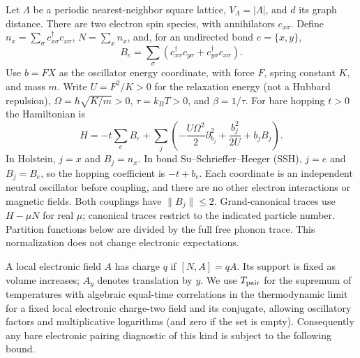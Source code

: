 \documentclass[11pt]{article}
\begin{document}
Let $\Lambda$ be a periodic nearest-neighbor square lattice, $V_\Lambda=|\Lambda|$, and $d$ its graph distance. There are two electron spin species, with annihilators $c_{x\sigma}$. Define $n_x=\sum_\sigma c_{x\sigma}^\dagger c_{x\sigma}$, $N=\sum_x n_x$, and, for an undirected bond $e=\{x,y\}$,
\[
 B_e=\sum_\sigma (c_{x\sigma}^\dagger c_{y\sigma}+c_{y\sigma}^\dagger c_{x\sigma}).
\]
Use $b=FX$ as the oscillator energy coordinate, with force $F$, spring constant $K$, and mass $m$. Write $U=F^2/K>0$ for the relaxation energy (not a Hubbard repulsion), $\Omega=\hbar\sqrt{K/m}>0$, $\tau=k_BT>0$, and $\beta=1/\tau$. For bare hopping $t>0$ the Hamiltonian is
\begin{equation}\label{eq:model}
 H=-t\sum_e B_e+\sum_j\left(-\frac{U\Omega^2}{2}\partial_{b_j}^2+\frac{b_j^2}{2U}+b_j B_j\right).
\end{equation}
In Holstein, $j=x$ and $B_j=n_x$. In bond Su--Schrieffer--Heeger (SSH), $j=e$ and $B_j=B_e$, so the hopping coefficient is $-t+b_e$. Each coordinate is an independent neutral oscillator before coupling, and there are no other electron interactions or magnetic fields. Both couplings have $\|B_j\|\le 2$. Grand-canonical traces use $H-\mu N$ for real $\mu$; canonical traces restrict to the indicated particle number. Partition functions below are divided by the full free phonon trace. This normalization does not change electronic expectations.

A local electronic field $A$ has charge $q$ if $[N,A]=qA$. Its support is fixed as volume increases; $A_y$ denotes translation by $y$. We use $T_{\rm pair}$ for the supremum of temperatures with algebraic equal-time correlations in the thermodynamic limit for a fixed local electronic charge-two field and its conjugate, allowing oscillatory factors and multiplicative logarithms (and zero if the set is empty). Consequently any bare electronic pairing diagnostic of this kind is subject to the following bound.
\end{document}
